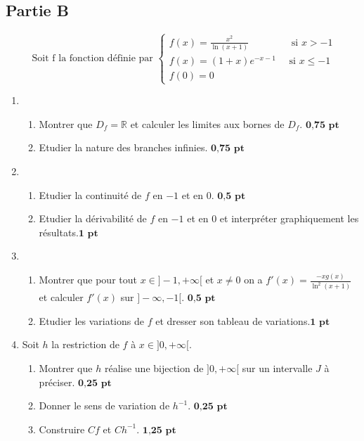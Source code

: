 \documentclass[12pt]{article}
\begin{document}
\subsection*{\centering Partie B}
$$
 \text{ Soit f la fonction définie par } 
\begin{cases}
f(x)=\frac{x^{2}}{\ln(x+1)}\quad\quad\quad\quad \text{ si } x>-1\\
f(x)=(1+x)e^{-x-1} \quad\text{ si } x\leq -1\\
f(0)=0
\end{cases}
$$
\begin{enumerate}
\item
\begin{enumerate}
\item[a.] Montrer que $D_{f}=\mathbb{R}$ et calculer les limites aux bornes de $D_{f}$. $\textbf{0,75 pt}$
\item[b.] Etudier la nature des branches infinies. $\textbf{0,75 pt}$
\end{enumerate}
\item
\begin{enumerate}
\item[a.] Etudier la continuité de $f$ en $-1$ et en $0$. $\textbf{0,5 pt}$
\item[b.] Etudier la dérivabilité de $f$ en $-1$ et en $0$ et interpréter graphiquement les résultats.$\textbf{1 pt}$
\end{enumerate}
\item
\begin{enumerate}
\item[a.] Montrer que pour tout $x \in ]-1, +\infty[$ et $x\neq 0$ on a $f'(x)=\frac{-xg(x)}{\ln^{2}(x+1)}$ et calculer $f'(x)$ sur $]-\infty, -1[$. $\textbf{0,5 pt}$
\item[b.] Etudier les variations de $f$ et dresser son tableau de variations.$\textbf{1 pt}$
\end{enumerate}
\item Soit $h$ la restriction de $f$ à $x \in ]0, +\infty[$.
\begin{enumerate}
\item[a.] Montrer que $h$ réalise une bijection de $]0, +\infty[$ sur un intervalle $J$ à préciser. $\textbf{0,25 pt}$
\item[b.] Donner le sens de variation de $h^{-1}$. $\textbf{0,25 pt}$
\item[c.] Construire $Cf$ et $Ch^{-1}$. $\textbf{1,25 pt}$
\end{enumerate}
\end{enumerate}
\end{document}
